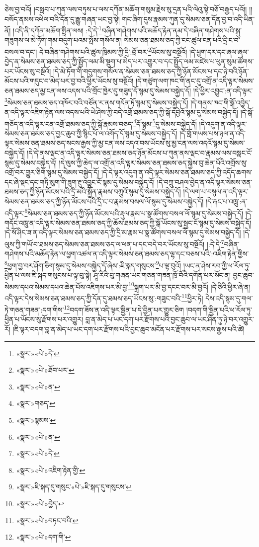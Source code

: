 ཅེས་བྱ་བའོ། །བསླབ་པ་ཀུན་ལས་བཏུས་པ་ལས་དཀོན་མཆོག་གསུམ་རྗེས་སུ་དྲན་པའི་ལེའུ་སྟེ་བཅོ་བརྒྱད་པའོ།། །།བསོད་ནམས་འཕེལ་བའི་དོན་དུ་རྒྱུ་གཞན་ཡང་བྱ་སྟེ། གང་ཞིག་དུས་རྣམས་ཀུན་དུ་སེམས་ཅན་དོན་བྱ་བ་འདི་ཡིན་ནོ། །འདི་ནི་དཀོན་མཆོག་སྤྲིན་ལས། :དེ་དེ་\footnote{«སྣར་»«པེ་»དེ་}བཞིན་གཤེགས་པའི་མཆོད་རྟེན་ནམ་དེ་བཞིན་གཤེགས་པའི་སྐུ་གཟུགས་ལ་མེ་ཏོག་གམ་བདུག་པའམ་སྤོས་གསོལ་ན། སེམས་ཅན་ཐམས་ཅད་ཀྱི་ངང་ཚུལ་ངན་པའི་དྲི་ང་བ་བསལ་བ་དང་། དེ་བཞིན་གཤེགས་པའི་ཚུལ་ཁྲིམས་ཀྱི་དྲི་:བྲོ་བར་\footnote{«སྣར་»«པེ་»ཐོབ་པར་}ཡོངས་སུ་བསྔོའོ། །དེ་ཕྱག་དར་དང་ཞལ་ཞལ་བྱེད་ན་སེམས་ཅན་ཐམས་ཅད་ཀྱི་སྤྱོད་ལམ་མི་སྡུག་པ་མེད་པར་འགྱུར་བ་དང་སྤྱོད་ལམ་མཛེས་པ་ཕུན་སུམ་ཚོགས་པར་ཡོངས་སུ་བསྔོའོ། །དེ་མེ་ཏོག་གི་གདུགས་གསོལ་ན་སེམས་ཅན་ཐམས་ཅད་ཀྱི་ཉོན་མོངས་པ་དང་ཉེ་བའི་ཉོན་མོངས་པའི་གདུང་བ་མེད་པར་བྱ་བའི་ཕྱིར་ཡོངས་སུ་བསྔོའོ། །དེ་གཙུག་ལག་ཁང་གི་ནང་དུ་འགྲོ་ན་འདི་ལྟར་སེམས་ཅན་ཐམས་ཅད་མྱ་ངན་ལས་འདས་པའི་གྲོང་ཁྱེར་དུ་གཟུད་དོ་སྙམ་དུ་སེམས་བསྐྱེད་དོ། །དེ་ཕྱིར་འབྱུང་:ན་འདི་ལྟར་\footnote{«སྣར་»«པེ་»ན་}སེམས་ཅན་ཐམས་ཅད་འཁོར་བའི་བཙོན་ར་ནས་གདོན་ཏོ་སྙམ་དུ་སེམས་བསྐྱེད་དོ། །དེ་གནས་ཁང་གི་སྒོ་འབྱེད་ན་འདི་ལྟར་འཇིག་རྟེན་ལས་འདས་པའི་ཡེ་ཤེས་ཀྱི་བདེ་འགྲོ་ཐམས་ཅད་ཀྱི་སྒོ་དབྱེའོ་སྙམ་དུ་སེམས་བསྐྱེད་དོ། །དེ་སྒོ་གཅོད་ན་འདི་ལྟར་ངན་འགྲོ་ཐམས་ཅད་ཀྱི་སྒོ་རྣམས་བཅད་\footnote{«སྣར་»གཅད་}དོ་སྙམ་\footnote{«སྣར་»སྙམས་}དུ་སེམས་བསྐྱེད་དོ། །དེ་འདུག་ན་འདི་ལྟར་སེམས་ཅན་ཐམས་ཅད་བྱང་ཆུབ་ཀྱི་སྙིང་པོ་ལ་འགོད་དོ་སྙམ་དུ་སེམས་བསྐྱེད་དོ། །དེ་གློ་གཡས་པས་ཉལ་ན་འདི་ལྟར་སེམས་ཅན་ཐམས་ཅད་སངས་རྒྱས་ཀྱི་མྱ་ངན་ལས་འདའ་བས་ཡོངས་སུ་མྱ་ངན་ལས་འདའོ་སྙམ་དུ་སེམས་བསྐྱེད་དོ། །དེ་དེ་ནས་ལྡང་ན་འདི་ལྟར་སེམས་ཅན་ཐམས་ཅད་ཉོན་མོངས་པ་ཀུན་ནས་ལྡང་བ་རྣམས་ལས་བསླང་ངོ་སྙམ་དུ་སེམས་བསྐྱེད་དོ། །དེ་ལུས་ཀྱི་ཆེད་ལ་འགྲོ་ན་འདི་ལྟར་སེམས་ཅན་ཐམས་ཅད་སྐྱེས་བུ་ཆེན་པོའི་འགྲོས་སུ་འགྲོ་བར་གྱུར་ཅིག་སྙམ་དུ་སེམས་བསྐྱེད་དོ། །དེ་དེ་ལྟར་འདུག་ན་འདི་ལྟར་སེམས་ཅན་ཐམས་ཅད་ཀྱི་འདོད་ཆགས་དང་ཞེ་སྡང་དང་གཏི་མུག་གི་ཟུག་རྔུ་འབྱུང་ངོ་སྙམ་དུ་སེམས་བསྐྱེད་དོ། །དེ་བཀྲུ་བཤལ་བྱེད་ན་འདི་ལྟར་སེམས་ཅན་ཐམས་ཅད་ཀྱི་ཉོན་མོངས་པའི་དྲི་མའི་སྐྱོན་རྣམས་བཀྲུའོ་སྙམ་དུ་སེམས་བསྐྱེད་དོ། །དེ་ལག་པ་བསྙལ་ན་འདི་ལྟར་སེམས་ཅན་ཐམས་ཅད་ཀྱི་ཉོན་མོངས་པའི་དྲི་ང་བ་རྣམས་བསལ་ལོ་སྙམ་དུ་སེམས་བསྐྱེད་དོ། །དེ་རྐང་པ་འཁྲུ་:ན་འདི་ལྟར་\footnote{«སྣར་»«པེ་»ན་}སེམས་ཅན་ཐམས་ཅད་ཀྱི་ཉོན་མོངས་པའི་རྡུལ་རྣམ་པ་སྣ་ཚོགས་བསལ་ལོ་སྙམ་དུ་སེམས་བསྐྱེད་དོ། །དེ་གདོང་འཁྲུ་ན་འདི་ལྟར་སེམས་ཅན་ཐམས་ཅད་ཀྱི་ཆོས་ཐམས་ཅད་ཀྱི་སྒོ་ཡོངས་སུ་སྦྱང་ངོ་སྙམ་དུ་སེམས་བསྐྱེད་དོ། །དེ་སོ་ཤིང་ཟ་ན་འདི་ལྟར་སེམས་ཅན་ཐམས་ཅད་ཀྱི་དྲི་མ་རྣམ་པ་སྣ་ཚོགས་བསལ་ལོ་སྙམ་དུ་སེམས་བསྐྱེད་དོ། །དེ་ལུས་ཀྱི་གཡོ་བ་ཐམས་ཅད་སེམས་ཅན་ཐམས་ཅད་ལ་ཕན་པ་དང་བདེ་བར་ཡོངས་སུ་བསྔོའོ། །:དེ་དེ་\footnote{«སྣར་»«པེ་»དེ་}བཞིན་གཤེགས་པའི་མཆོད་རྟེན་ལ་ཕྱག་འཚལ་ན་འདི་ལྟར་སེམས་ཅན་ཐམས་ཅད་ལྷ་དང་བཅས་པའི་:འཇིག་རྟེན་གྱིས་\footnote{«སྣར་»«པེ་»འཇིག་རྟེན་གྱི་}ཕྱག་བྱ་བར་ཤོག་ཅིག་སྙམ་དུ་སེམས་བསྐྱེད་དོ་ཞེས་:ཇི་སྐད་གསུངས་\footnote{«སྣར་»ཇི་སྐད་དུ་གསུང་«པེ་»ཇི་སྐད་དུ་གསུངས་}པ་ལྟ་བུའོ། །ཡང་ན་ཤེས་རབ་ཀྱི་ཕ་རོལ་ཏུ་ཕྱིན་པ་ལས་ཇི་སྐད་གསུངས་པ་ལྟ་བུ་སྟེ། ཤཱ་རིའི་བུ་གཞན་ཡང་གཅན་གཟན་ཁྲོ་བོའི་དགོན་པར་སོང་ན། བྱང་ཆུབ་སེམས་དཔའ་སེམས་དཔའ་ཆེན་པོས་འཇིགས་པར་མི་བྱ་\footnote{«སྣར་»«པེ་»བྱེད་}སྐྲག་པར་མི་བྱ་དངང་བར་མི་བྱའོ། །དེ་ཅིའི་ཕྱིར་ཞེ་ན། འདི་ལྟར་དེས་སེམས་ཅན་ཐམས་ཅད་ཀྱི་དོན་དུ་ཐམས་ཅད་ཡོངས་སུ་:གཟུང་བའི་\footnote{«སྣར་»«པེ་»བཏང་བའི་}ཕྱིར་ཏེ། དེས་འདི་སྙམ་དུ་གལ་ཏེ་གཅན་གཟན་:དག་གིས་\footnote{«སྣར་»«པེ་»དག་གི་}བདག་ཟོས་ན་འདི་ལྟར་སྦྱིན་པ་དེ་བྱིན་པར་གྱུར་ཅིག །བདག་གི་སྦྱིན་པའི་ཕ་རོལ་ཏུ་ཕྱིན་པ་ཡོངས་སུ་རྫོགས་པར་འགྱུར། བླ་ན་མེད་པ་ཡང་དག་པར་རྫོགས་པའི་བྱང་ཆུབ་ལ་ཡང་ཤིན་ཏུ་ཉེ་བར་འགྱུར་རོ། །ཇི་ལྟར་བདག་བླ་ན་མེད་པ་ཡང་དག་པར་རྫོགས་པའི་བྱང་ཆུབ་མངོན་པར་རྫོགས་པར་སངས་རྒྱས་པའི་ཚེ། 
